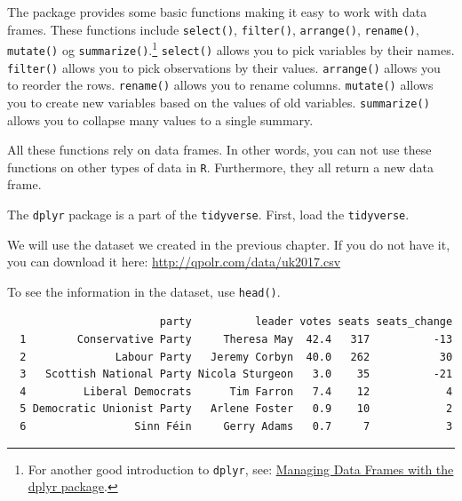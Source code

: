 \documentclass[12pt,oneside]{reedthesis}
\theoremstyle{definition}
\theoremstyle{definition}
\theoremstyle{definition}
\theoremstyle{remark}
\begin{document}
  The package provides some basic functions making it easy to work with
  data frames. These functions include \texttt{select()},
  \texttt{filter()}, \texttt{arrange()}, \texttt{rename()},
  \texttt{mutate()} og \texttt{summarize()}.\footnote{For another good
    introduction to \texttt{dplyr}, see:
    \href{https://bookdown.org/rdpeng/rprogdatascience/managing-data-frames-with-the-dplyr-package.html}{Managing
    Data Frames with the dplyr package}.} \texttt{select()} allows you to
  pick variables by their names. \texttt{filter()} allows you to pick
  observations by their values. \texttt{arrange()} allows you to reorder
  the rows. \texttt{rename()} allows you to rename columns.
  \texttt{mutate()} allows you to create new variables based on the values
  of old variables. \texttt{summarize()} allows you to collapse many
  values to a single summary.
  
  All these functions rely on data frames. In other words, you can not use
  these functions on other types of data in \texttt{R}. Furthermore, they
  all return a new data frame.
  
  The \texttt{dplyr} package is a part of the \texttt{tidyverse}. First,
  load the \texttt{tidyverse}.
  \begin{Shaded}
  \begin{Highlighting}[]
  \NormalTok{(}\NormalTok{)}
  \end{Highlighting}
  \end{Shaded}
  We will use the dataset we created in the previous chapter. If you do
  not have it, you can download it here:
  \url{http://qpolr.com/data/uk2017.csv}
  \begin{Shaded}
  \begin{Highlighting}[]
  \StringTok{ }\NormalTok{(}\NormalTok{)}
  \end{Highlighting}
  \end{Shaded}
  To see the information in the dataset, use \texttt{head()}.
  \begin{Shaded}
  \begin{Highlighting}[]
  \end{Highlighting}
  \end{Shaded}
  \begin{verbatim}
                        party          leader votes seats seats_change
  1        Conservative Party     Theresa May  42.4   317          -13
  2              Labour Party   Jeremy Corbyn  40.0   262           30
  3   Scottish National Party Nicola Sturgeon   3.0    35          -21
  4         Liberal Democrats      Tim Farron   7.4    12            4
  5 Democratic Unionist Party   Arlene Foster   0.9    10            2
  6                 Sinn Féin     Gerry Adams   0.7     7            3
  \end{verbatim}
\end{document}
